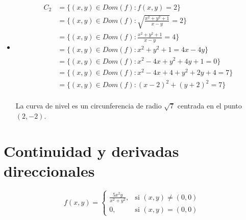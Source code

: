\documentclass{article}
\begin{document}
\begin{itemize}
\begin{itemize}
      \item \begin{align*}
        C_{2} &= \{(x, y) \in Dom(f) : f(x, y) = 2\} \\
        &= \{(x, y) \in Dom(f) : \sqrt{\frac{x^2 + y^2 + 1}{x - y}} = 2\} \\
        &= \{(x, y) \in Dom(f) : \frac{x^2 + y^2 + 1}{x - y} = 4\} \\
        &= \{(x, y) \in Dom(f) : x^2 + y^2 + 1 = 4x - 4y\} \\
        &= \{(x, y) \in Dom(f) : x^2 - 4x + y^2 + 4y + 1 = 0\} \\
        &= \{(x, y) \in Dom(f) : x^2 - 4x + 4 + y^2 + 2y + 4 = 7\} \\
        &= \{(x, y) \in Dom(f) : (x - 2)^2 + (y + 2)^2 = 7\} \\
      \end{align*}

      La curva de nivel es un circunferencia de radio $\sqrt{7}$ centrada en el punto $(2, -2)$.

    \end{itemize}
\end{itemize}

\section{Continuidad y derivadas direccionales}

\[
  f(x, y) = \begin{cases}
    \frac{5x^2y}{x^2 + y^2}, & \text{si } (x, y) \neq (0, 0) \\
    0, & \text{si } (x, y) = (0, 0) 
  \end{cases}
\]
\end{document}
